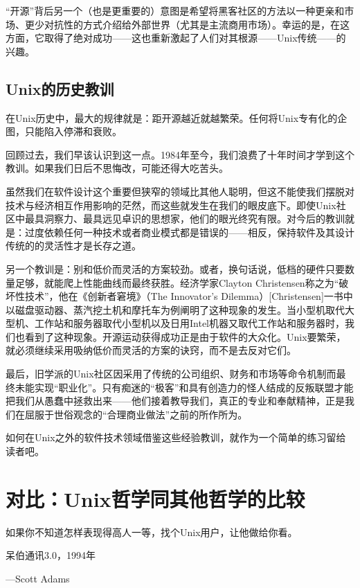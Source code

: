 \documentclass[12pt,oneside]{book}
\begin{document}
\begin{common-format}
“开源”背后另一个（也是更重要的）意图是希望将黑客社区的方法以一种更亲和市场、更少对抗性的方式介绍给外部世界（尤其是主流商用市场）。幸运的是，在这方面，它取得了绝对成功——这也重新激起了人们对其根源——Unix传统——的兴趣。

\section{Unix的历史教训}
在Unix历史中，最大的规律就是：距开源越近就越繁荣。任何将Unix专有化的企图，只能陷入停滞和衰败。

回顾过去，我们早该认识到这一点。1984年至今，我们浪费了十年时间才学到这个教训。如果我们日后不思悔改，可能还得大吃苦头。

虽然我们在软件设计这个重要但狭窄的领域比其他人聪明，但这不能使我们摆脱对技术与经济相互作用影响的茫然，而这些就发生在我们的眼皮底下。即使Unix社区中最具洞察力、最具远见卓识的思想家，他们的眼光终究有限。对今后的教训就是：过度依赖任何一种技术或者商业模式都是错误的——相反，保持软件及其设计传统的的灵活性才是长存之道。

另一个教训是：别和低价而灵活的方案较劲。或者，换句话说，低档的硬件只要数量足够，就能爬上性能曲线而最终获胜。经济学家Clayton Christensen称之为“破坏性技术”，他在《创新者窘境》（The Innovator's Dilemma）[Christensen]一书中以磁盘驱动器、蒸汽挖土机和摩托车为例阐明了这种现象的发生。当小型机取代大型机、工作站和服务器取代小型机以及日用Intel机器又取代工作站和服务器时，我们也看到了这种现象。开源运动获得成功正是由于软件的大众化。Unix要繁荣，就必须继续采用吸纳低价而灵活的方案的诀窍，而不是去反对它们。

最后，旧学派的Unix社区因采用了传统的公司组织、财务和市场等命令机制而最终未能实现“职业化”。只有痴迷的“极客”和具有创造力的怪人结成的反叛联盟才能把我们从愚蠢中拯救出来——他们接着教导我们，真正的专业和奉献精神，正是我们在屈服于世俗观念的“合理商业做法”之前的所作所为。

如何在Unix之外的软件技术领域借鉴这些经验教训，就作为一个简单的练习留给读者吧。




\chapter{对比：Unix哲学同其他哲学的比较}
\begin{flushright}
\begin{notecard}{16em}
如果你不知道怎样表现得高人一等，找个Unix用户，让他做给你看。

{\hfill 呆伯通讯3.0，1994年}

{\hfill —Scott Adams}
\end{notecard}
\end{flushright}


\end{common-format}
\end{document}
